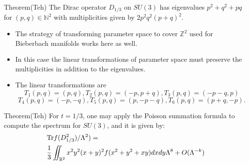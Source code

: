 \documentclass{beamer}
\def\N{{\mathbb N}}
\def\Z{{\mathbb Z}}
\def\R{{\mathbb R}}
\def\Tr{{\rm Tr}}
\begin{document}
\begin{frame}
  \begin{block}{Theorem(Teh)}
    The Dirac operator $D_{1/3}$ on $SU(3)$ has eigenvalues $p^2 + q^2 + pq$ for $(p,q) \in \N^2$ with multiplicities given by $2p^2q^2(p+q)^2$.
  \end{block}

  \begin{block}{}
    \begin{itemize}
      \item The strategy of transforming parameter space to cover $\Z^2$ used for Bieberbach manifolds works here as well.
      \item In this case the linear transformations of parameter space must preserve the multiplicities in addition to the eigenvalues.
      \item The linear transformations are 
\[
T_1 (p,q) = (p,q), T_2(p,q) = (-p,p+q), T_3(p,q) = (-p-q,p)
\]
\[T_4(p,q) = (-p,-q),  T_5(p,q) = (p,-p-q), T_6(p,q) = (p+q,-p).
\]
    \end{itemize}
  \end{block}
\end{frame}

\begin{frame}
  \begin{block}{Theorem(Teh)}
    For $t = 1/3$, one may apply the Poisson summation formula to compute the spectrum for $SU(3)$, and it is given by:
    \begin{align*}
      & \Tr f(D_{1/3}^2)/\Lambda ^2) = \\
                                   & \frac{1}{3}\iint_{\R ^2} x^2y^2(x+y)^2f(x^2+y^2+xy)dxdy \Lambda^8 + O(\Lambda ^{-k})
    \end{align*}
  \end{block}
\end{frame}
\end{document}
